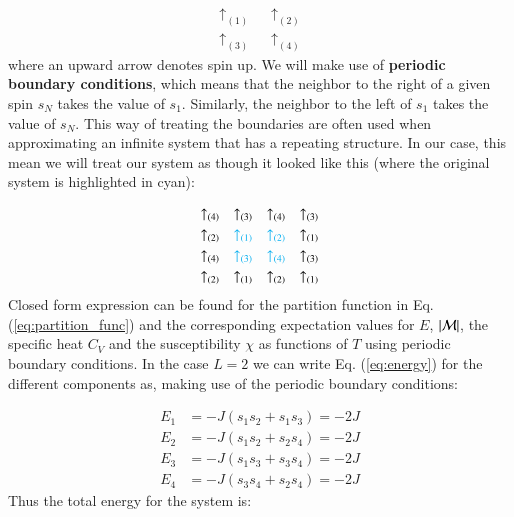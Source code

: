 \documentclass{article}
\begin{document}
\begin{multicols}{2}
\begin{equation*}
\begin{aligned}
	\uparrow_{(1)} \quad \uparrow_{(2)}   \\
	\uparrow_{(3)} \quad \uparrow_{(4)}   
\end{aligned}
\end{equation*}
where an upward arrow denotes spin up. We will make use of \textbf{periodic boundary conditions}, which means that the neighbor to the right of a given spin $s_N$ takes the value of $s_1$. Similarly, the neighbor to the left of $s_1$ takes the value of $s_N$. This way of treating the boundaries are often used when approximating an infinite system that has a repeating structure. In our case, this mean we will treat our system as though it looked like this (where the original system is highlighted in cyan):

\begin{equation}
\begin{aligned}
	\textcolor{black}{\uparrow_{(4)}} \quad \textcolor{black}{\uparrow_{(3)}} \quad \textcolor{black}{\uparrow_{(4)}} \quad \textcolor{black}{\uparrow_{(3)}} \\
	\textcolor{black}{\uparrow_{(2)}} \quad \textcolor{cyan}{\uparrow_{(1)}} \quad \textcolor{cyan}{\uparrow_{(2)}} \quad \textcolor{black}{\uparrow_{(1)}} \\
	\textcolor{black}{\uparrow_{(4)}} \quad \textcolor{cyan}{\uparrow_{(3)}} \quad \textcolor{cyan}{\uparrow_{(4)}} \quad \textcolor{black}{\uparrow_{(3)}} \\
	\textcolor{black}{\uparrow_{(2)}} \quad \textcolor{black}{\uparrow_{(1)}} \quad \textcolor{black}{\uparrow_{(2)}} \quad \textcolor{black}{\uparrow_{(1)}}
\end{aligned}
\end{equation}
Closed form expression can be found for the partition function in Eq. (\ref{eq:partition_func}) and the corresponding expectation values for $E$, $|{\cal M}|$, the specific heat $C_V$ and the susceptibility $\chi$ as functions of $T$ using periodic boundary conditions. In the case $L = 2$ we can write Eq. (\ref{eq:energy}) for the different components as, making use of the periodic boundary conditions:

\begin{equation*}
\begin{aligned}
	E_1 &= - J (s_1 s_2 + s_1 s_3) = - 2J \\
	E_2 &= - J (s_1 s_2 + s_2 s_4) = - 2J \\
	E_3 &= - J (s_1 s_3 + s_3 s_4) = - 2J \\
	E_4 &= - J (s_3 s_4 + s_2 s_4) = - 2J 
\end{aligned}
\end{equation*}
Thus the total energy for the system is:


\end{multicols}
\end{document}
